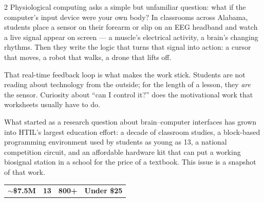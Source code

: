 \documentclass[10pt,letterpaper]{article}
\makeatletter
\newcommand{\statcell}[2]{{\color{htilred}\fontsize{18.5}{19}\selectfont\bfseries #1}\par\vspace{1pt}{\color{htilgray}\fontsize{7.2}{8.7}\selectfont #2}}
\newcommand{\statband}[8]{%
  \par\vspace{4pt}%
  \noindent{\color{htilink}\rule{\linewidth}{1.4pt}}\par\vspace{3pt}%
  \noindent\begin{tabularx}{\linewidth}{@{}X|X|X|X@{}}
    \statcell{#1}{#2} & \statcell{#3}{#4} & \statcell{#5}{#6} & \statcell{#7}{#8} \\
  \end{tabularx}\par\vspace{2pt}%
  \noindent{\color{htilrule}\rule{\linewidth}{0.4pt}}\par\vspace{2pt}}
\makeatother
\begin{document}
\vspace{2pt}
\begin{multicols}{2}
Physiological computing asks a simple but unfamiliar question: what if the computer's input device were your own body? In classrooms across Alabama, students place a sensor on their forearm or slip on an EEG headband and watch a live signal appear on screen --- a muscle's electrical activity, a brain's changing rhythms. Then they write the logic that turns that signal into action: a cursor that moves, a robot that walks, a drone that lifts off.

That real-time feedback loop is what makes the work stick. Students are not reading about technology from the outside; for the length of a lesson, they \emph{are} the sensor. Curiosity about ``can I control it?'' does the motivational work that worksheets usually have to do.

What started as a research question about brain--computer interfaces has grown into HTIL's largest education effort: a decade of classroom studies, a block-based programming environment used by students as young as 13, a national competition circuit, and an affordable hardware kit that can put a working biosignal station in a school for the price of a textbook. This issue is a snapshot of that work.
\end{multicols}

\statband
  {$\sim$\$7.5M}{Research funding supporting the lab's physiological computing and K--12 education programs}%
  {13}{Age of the youngest students building their own BCI applications with HTIL software}%
  {800+}{Media features and placements, including Forbes, The New York Times, and PBS NewsHour}%
  {Under \$25}{Target cost of a complete classroom biosignal station built on the lab's open EMG design}
\end{document}

